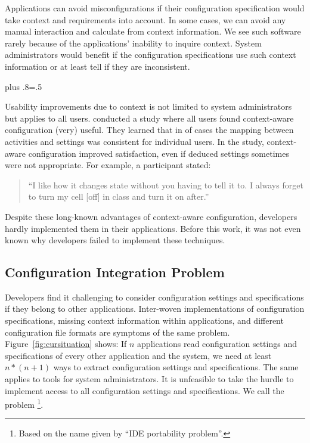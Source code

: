 Applications can avoid misconfigurations if their configuration specification would take context and requirements into account.
In some cases, we can avoid any manual interaction and calculate  from context information.
We see such software rarely because of the applications' inability to inquire context.
System administrators would benefit if the configuration specifications use such context information or at least tell if they are inconsistent.%
{\parfillskip=0pt plus .8\textwidth \emergencystretch=.5\textwidth \par}

Usability improvements due to context is not limited to system administrators but applies to all users.
\citet{khalil2005context} conducted a study where all users found context-aware configuration (very) useful.
They learned that in  of cases the mapping between activities and settings was consistent for individual users.
In the study, context-aware configuration improved satisfaction, even if deduced settings sometimes were not appropriate.
For example, a participant stated:

\begin{quote}
``I like how it changes state without you having to tell it to. I always forget to turn my cell [off] in class and turn it on after.''
\end{quote}

Despite these long-known advantages of context-aware configuration, developers hardly implemented them in their applications.
Before this work, it was not even known why developers failed to implement these techniques.

\subsection{Configuration Integration Problem}

\label{sec:introduction-configuration-integration}
Developers find it challenging to consider configuration settings and specifications if they belong to other applications.
Inter-woven implementations of configuration specifications, missing context information within applications, and different configuration file formats are symptoms of the same problem.
Figure~\ref{fig:cursituation} shows:
If $n$ applications read configuration settings and specifications of every other application and the system, we need at least $n*(n+1)$ ways to extract configuration settings and specifications.
The same applies to tools for system administrators.
It is unfeasible to take the hurdle to implement access to all configuration settings and specifications.
We call the problem \linebreak {}\footnote{Based on the name given by \citet{keidel2016ide} \enquote{IDE portability problem}.}.

